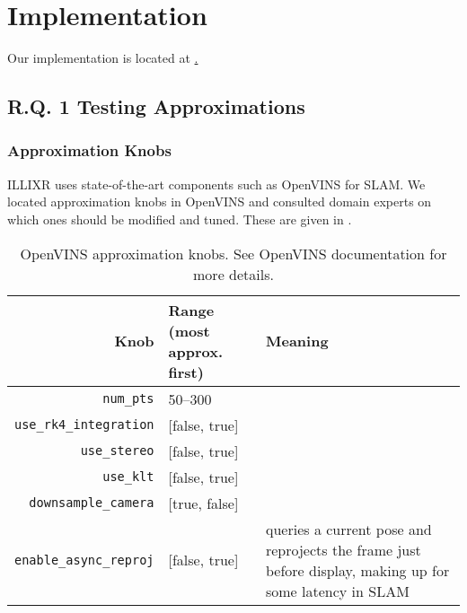 \section{Implementation}

Our implementation is located at \href{https://github.com/ILLIXR/ILLIXR/tree/illixr-testing}.

\subsection{R.Q. 1 Testing Approximations}

\subsubsection{Approximation Knobs}

ILLIXR uses state-of-the-art components such as OpenVINS\cite{Geneva2020ICRA} for SLAM. We located approximation knobs in OpenVINS and consulted domain experts on which ones should be modified and tuned. These are given in
.


\begin{table}
  {
    \caption{OpenVINS approximation knobs. See OpenVINS documentation for more details\cite{Geneva2020ICRA}.}
    \begin{tabularx}{\linewidth}{r||lX}
      \textbf{Knob} & \textbf{Range} (most approx. first) & \textbf{Meaning} \\
      \hline\hline
      \verb+num_pts+ & 50--300 & \\
      \verb+use_rk4_integration+ & [false, true] & \\
      \verb+use_stereo+ & [false, true] & \\
      \verb+use_klt+ & [false, true] & \\
      \verb+downsample_camera+ & [true, false] & \\
      \verb+enable_async_reproj+ & [false, true] & queries a current pose and reprojects the frame just before display, making up for some latency in SLAM \\
    \end{tabularx}
  }
\end{table}

